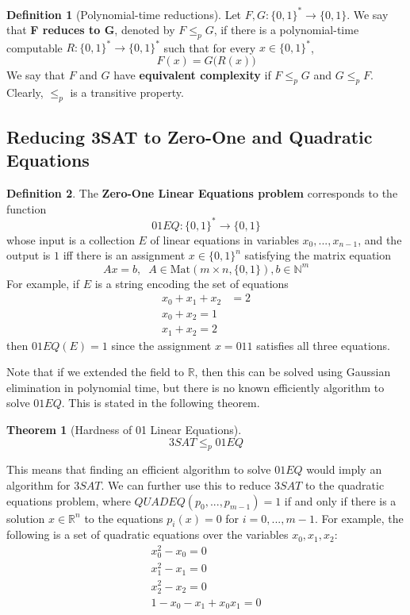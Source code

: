\documentclass[a4paper, 12pt]{report}
\newtheorem{theorem}{Theorem}[section]
\theoremstyle{remark}
\theoremstyle{definition}
\newtheorem{definition}{Definition}[section]
\begin{document}
\begin{definition}[Polynomial-time reductions]
Let $F, G: \{0,1\}^* \longrightarrow \{0,1\}$. We say that \textbf{F reduces to G}, denoted by $F \leq_p G$, if there is a polynomial-time computable $R: \{0,1\}^* \longrightarrow \{0,1\}^*$ such that for every $x \in \{0,1\}^*$, 
\[F(x) = G \big(R(x)\big)\]
We say that $F$ and $G$ have \textbf{equivalent complexity} if $F \leq_p G$ and $G \leq_p F$. Clearly, $\leq_p$ is a transitive property. 
\end{definition}

\subsection{Reducing 3SAT to Zero-One and Quadratic Equations}
\begin{definition}
The \textbf{Zero-One Linear Equations problem} corresponds to the function 
\[01EQ: \{0,1\}^* \longrightarrow \{0,1\}\]
whose input is a collection $E$ of linear equations in variables $x_0, ..., x_{n-1}$, and the output is $1$ iff there is an assignment $x \in \{0,1\}^n$ satisfying the matrix equation
\[A x = b, \;\; A \in \text{Mat}(m \times n, \{0,1\}), b \in \mathbb{N}^m\]
For example, if $E$ is a string encoding the set of equations
\begin{align*}
    x_0 + x_1 + x_2 & = 2 \\
    x_0 + x_2 = 1 \\
    x_1 + x_2 = 2
\end{align*}
then $01EQ(E) = 1$ since the assignment $x = 011$ satisfies all three equations.  
\end{definition}

Note that if we extended the field to $\mathbb{R}$, then this can be solved using Gaussian elimination in polynomial time, but there is no known efficiently algorithm to solve $01EQ$. This is stated in the following theorem. 

\begin{theorem}[Hardness of 01 Linear Equations]
\[3SAT \leq_p 01EQ\]
\end{theorem}

This means that finding an efficient algorithm to solve $01EQ$ would imply an algorithm for $3SAT$. We can further use this to reduce $3SAT$ to the quadratic equations problem, where $QUADEQ(p_0, ..., p_{m-1}) = 1$ if and only if there is a solution $x \in \mathbb{R}^n$ to the equations $p_i (x) = 0$ for $i = 0, ..., m-1$. For example, the following is a set of quadratic equations over the variables $x_0, x_1, x_2$: 
\begin{align*}
    x_0^2 - x_0 = 0 \\
    x_1^2 - x_1 = 0 \\
    x_2^2 - x_2 = 0 \\
    1 - x_0 - x_1 + x_0 x_1 = 0
\end{align*}
\end{document}
